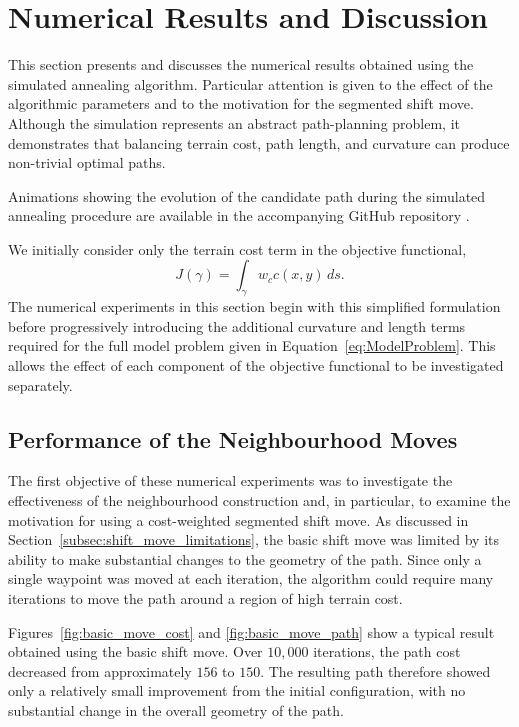 \section{Numerical Results and Discussion}

This section presents and discusses the numerical results obtained using
the simulated annealing algorithm. Particular attention is given to the
effect of the algorithmic parameters and to the motivation for the
segmented shift move. Although the simulation represents an abstract
path-planning problem, it demonstrates that balancing terrain cost,
path length, and curvature can produce non-trivial optimal paths.

Animations showing the evolution of the candidate path during the
simulated annealing procedure are available in the accompanying GitHub
repository \cite{skerman2026calculus}.

We initially consider only the terrain cost term in the objective
functional,
\[
J(\gamma)
=
\int_\gamma
w_c c(x,y)\,ds.
\]
The numerical experiments in this section begin with this simplified formulation before progressively introducing the additional curvature and length terms required for the full model problem given in Equation~\eqref{eq:ModelProblem}. This allows the effect of each component of the objective functional to be investigated separately.

\subsection{Performance of the Neighbourhood Moves}

The first objective of these numerical experiments was to investigate
the effectiveness of the neighbourhood construction and, in particular,
to examine the motivation for using a cost-weighted segmented shift
move. As discussed in Section~\ref{subsec:shift_move_limitations}, the
basic shift move was limited by its ability to make substantial changes
to the geometry of the path. Since only a single waypoint was moved at
each iteration, the algorithm could require many iterations to move the
path around a region of high terrain cost.

Figures~\ref{fig:basic_move_cost} and \ref{fig:basic_move_path} show a
typical result obtained using the basic shift move. Over $10{,}000$
iterations, the path cost decreased from approximately $156$ to $150$.
The resulting path therefore showed only a relatively small improvement
from the initial configuration, with no substantial change in the
overall geometry of the path.

